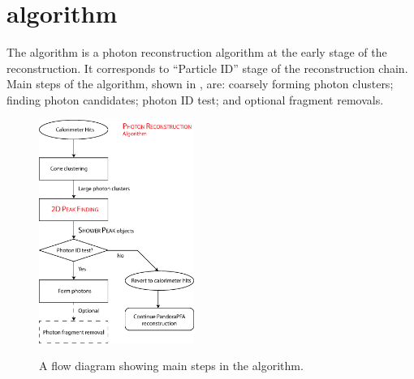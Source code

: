 



\section{\PhotonReconstruction algorithm}
\label{sec:photonRecostrcution}


The \PhotonReconstruction algorithm is a photon reconstruction  algorithm at the early stage of the reconstruction. It corresponds to ``Particle ID'' stage of the \pandora reconstruction chain.  Main steps of the \PhotonReconstruction algorithm, shown in , are:  coarsely forming photon clusters; finding photon candidates; photon ID test; and optional fragment removals.


\begin{figure}[tbph]
\centering
{\includegraphics[width=0.45\textwidth]{photon/photonRecoFlow}}
\caption[A flow diagram of the \PhotonReconstruction algorithm.]
{A flow diagram showing main steps in the \PhotonReconstruction algorithm.}
\label{fig:photonPhotonRecoFlow}
\end{figure}


